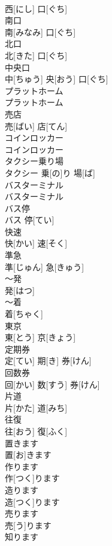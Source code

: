 \documentclass[8pt]{extreport}
\begin{document}
\begin{CJK}{UTF8}{min}
\\	西[にし] 口[ぐち]		
\\	南口	
\\	南[みなみ] 口[ぐち]		
\\	北口	
\\	北[きた] 口[ぐち]		
\\	中央口	
\\	中[ちゅう] 央[おう] 口[ぐち]		
\\	プラットホーム	
\\	プラットホーム		
\\	売店	
\\	売[ばい] 店[てん]		
\\	コインロッカー	
\\	コインロッカー		
\\	タクシー乗り場	
\\	タクシー 乗[の]り 場[ば]		
\\	バスターミナル	
\\	バスターミナル		
\\	バス停	
\\	バス 停[てい]		
\\	快速	
\\	快[かい] 速[そく]		
\\	準急	
\\	準[じゅん] 急[きゅう]		
\\	～発	
\\	発[はつ]		
\\	～着	
\\	着[ちゃく]		
\\	東京	
\\	東[とう] 京[きょう]		
\\	定期券	
\\	定[てい] 期[き] 券[けん]		
\\	回数券	
\\	回[かい] 数[すう] 券[けん]		
\\	片道	
\\	片[かた] 道[みち]		
\\	往復	
\\	往[おう] 復[ふく]		
\\	置きます	
\\	置[お]きます		
\\	作ります	
\\	作[つく]ります		
\\	造ります	
\\	造[つく]ります		
\\	売ります	
\\	売[う]ります		
\\	知ります	

\end{CJK}
\end{document}
